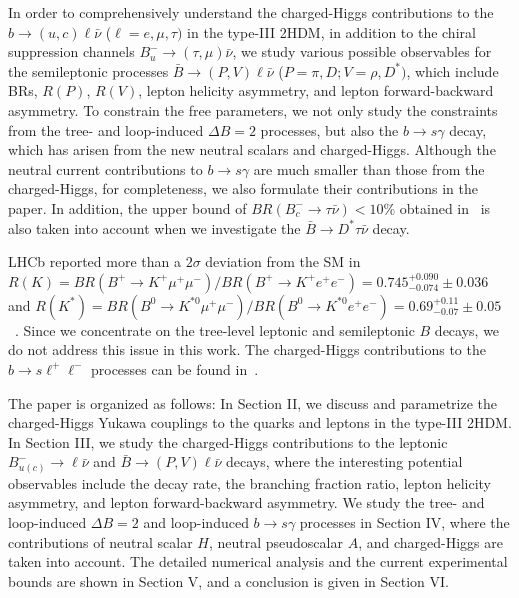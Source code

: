 \documentclass[prd,preprint,superscriptaddress,amsmath,amssymb]{revtex4}
\begin{document}
 In order to comprehensively understand the charged-Higgs contributions to the $b\to (u, c) \ell \bar \nu$ ($\ell=e, \mu,\tau)$ in the type-III 2HDM, in addition to the chiral suppression channels $B^-_u \to (\tau, \mu) \bar\nu$, we study various possible observables for the semileptonic processes $\bar B \to (P, V) \ell \bar\nu$ ($P=\pi, D; V=\rho, D^*)$, which include BRs, $R(P)$, $R(V)$, lepton helicity asymmetry,  and lepton forward-backward asymmetry. To constrain the free parameters, we not only study the constraints from the tree- and loop-induced $\Delta B=2$ processes, but also the $b\to s \gamma$ decay, which has arisen from the  new neutral scalars and charged-Higgs. Although  the neutral current contributions to $b\to s \gamma$ are much smaller than those from the charged-Higgs, for completeness, we also formulate their contributions in the paper. In addition,   the upper bound of $BR(B^-_c \to \tau \bar\nu) < 10\%$ obtained in~\cite{Akeroyd:2017mhr} is also taken into account  when we investigate the $\bar B \to D^* \tau \bar\nu$  decay.  
 
LHCb reported more than a $2\sigma$ deviation from the SM in $R(K) = BR(B^+\to K^+ \mu^+ \mu^-)/BR(B^+\to K^+ e^+ e^-)=0.745^{+0.090}_{-0.074} \pm 0.036$~\cite{Aaij:2014ora} and $R(K^*) = BR(B^0\to K^{*0} \mu^+ \mu^-)/BR(B^0\to K^{*0} e^+ e^-)= 0.69^{+0.11}_{-0.07} \pm 0.05$~\cite{Aaij:2017vbb}. 
Since we concentrate on the tree-level leptonic and semileptonic $B$ decays, we do not address this issue in this work. The charged-Higgs contributions to the $b\to s \ell^+ \ell^-$ processes can be found in~\cite{Hussain:2017tdf,Arnan:2017lxi,Arbey:2017gmh,Arhrib:2017yby,Choudhury:2017ijp,Iguro:2018qzf}.

The paper is organized as follows: In Section II, we discuss and parametrize the charged-Higgs Yukawa couplings to the quarks and leptons in the type-III 2HDM. In Section III, we study the charged-Higgs contributions to the leptonic $B^-_{u(c)} \to \ell \bar \nu$ and $\bar B \to (P, V) \ell \bar \nu$ decays, where  the interesting potential observables include the decay rate,  the branching fraction ratio, lepton helicity asymmetry, and lepton forward-backward asymmetry.  We study the tree- and loop-induced $\Delta B=2$ and loop-induced $b\to s \gamma$ processes in Section IV, where  the contributions of neutral scalar $H$, neutral pseudoscalar $A$, and charged-Higgs are taken into account.  The detailed numerical analysis and the current experimental bounds are shown in Section V, and a conclusion is given in Section VI. 
\end{document}
